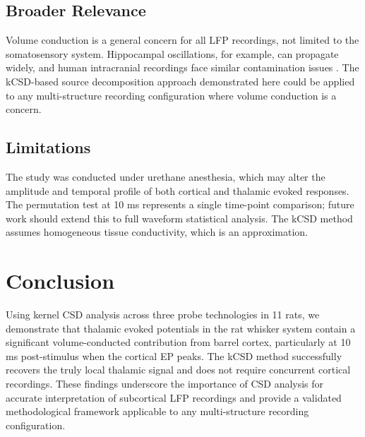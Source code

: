 \documentclass[12pt]{article}
\begin{document}
\subsection{Broader Relevance}

Volume conduction is a general concern for all LFP recordings, not limited to the somatosensory system. Hippocampal oscillations, for example, can propagate widely, and human intracranial recordings face similar contamination issues \citep{katzner2009local, mitzdorf1985current}. The kCSD-based source decomposition approach demonstrated here could be applied to any multi-structure recording configuration where volume conduction is a concern.

\subsection{Limitations}

The study was conducted under urethane anesthesia, which may alter the amplitude and temporal profile of both cortical and thalamic evoked responses. The permutation test at 10 ms represents a single time-point comparison; future work should extend this to full waveform statistical analysis. The kCSD method assumes homogeneous tissue conductivity, which is an approximation.

\section{Conclusion}

Using kernel CSD analysis across three probe technologies in 11 rats, we demonstrate that thalamic evoked potentials in the rat whisker system contain a significant volume-conducted contribution from barrel cortex, particularly at 10 ms post-stimulus when the cortical EP peaks. The kCSD method successfully recovers the truly local thalamic signal and does not require concurrent cortical recordings. These findings underscore the importance of CSD analysis for accurate interpretation of subcortical LFP recordings and provide a validated methodological framework applicable to any multi-structure recording configuration.



\end{document}
